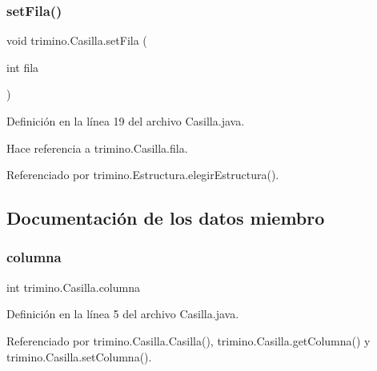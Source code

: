 \subsubsection{\texorpdfstring{setFila()}{setFila()}}
{\footnotesize\ttfamily void trimino.\+Casilla.\+set\+Fila (\begin{DoxyParamCaption}\item[{int}]{fila }\end{DoxyParamCaption})}



Definición en la línea 19 del archivo Casilla.\+java.


\begin{DoxyCode}{0}

\end{DoxyCode}


Hace referencia a trimino.\+Casilla.\+fila.



Referenciado por trimino.\+Estructura.\+elegir\+Estructura().



\subsection{Documentación de los datos miembro}
\mbox{\label{classtrimino_1_1Casilla_a986c2b8494ca294496488ba7d1e7a4a1}} 
\subsubsection{\texorpdfstring{columna}{columna}}
{\footnotesize\ttfamily int trimino.\+Casilla.\+columna\hspace{0.3cm}{\ttfamily [private]}}



Definición en la línea 5 del archivo Casilla.\+java.



Referenciado por trimino.\+Casilla.\+Casilla(), trimino.\+Casilla.\+get\+Columna() y trimino.\+Casilla.\+set\+Columna().

\mbox{\label{classtrimino_1_1Casilla_afedc09c20ce52a667dc80746f28b63e2}} 
